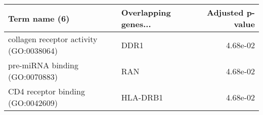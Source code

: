 \begin{tabular}{llr}
\toprule
                          Term name (6) & Overlapping genes... &  Adjusted p-value \\
\midrule
collagen receptor activity (GO:0038064) &                 DDR1 &          4.68e-02 \\
         pre-miRNA binding (GO:0070883) &                  RAN &          4.68e-02 \\
      CD4 receptor binding (GO:0042609) &             HLA-DRB1 &          4.68e-02 \\
\bottomrule
\end{tabular}
